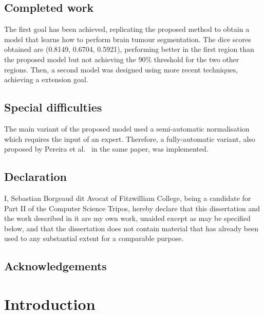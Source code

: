 \documentclass[12pt,a4paper,twoside,openright]{report}
\begin{document}
\section*{Completed work}
The first goal has been achieved, replicating the proposed method to obtain a model that learns how to perform brain tumour segmentation. The dice scores obtained are (0.8149, 0.6704, 0.5921), performing better in the first region than the proposed model but not achieving the 90\% threshold for the two other regions. Then, a second model was designed using more recent techniques, achieving a extension goal.

\section*{Special difficulties}
The main variant of the proposed model used a semi-automatic normalisation which requires the input of an expert. Therefore, a fully-automatic variant, also proposed by Pereira et al.\ \cite{pereira} in the same paper, was implemented.
\newpage
\section*{Declaration}

I, Sebastian Borgeaud dit Avocat of Fitzwilliam College, being a candidate for Part II of the Computer Science Tripos, hereby declare
that this dissertation and the work described in it are my own work,
unaided except as may be specified below, and that the dissertation
does not contain material that has already been used to any substantial
extent for a comparable purpose.

\bigskip
{}

\medskip
{}

\tableofcontents

\listoffigures

\newpage

\setlength{\parskip}{1em} %

\section*{Acknowledgements}



\pagestyle{headings}

\chapter{Introduction}
\end{document}
